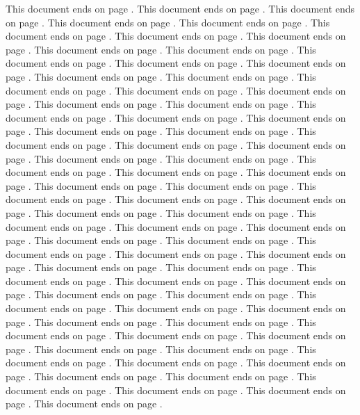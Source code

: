 \documentclass[a4paper]{article}
\begin{document}
This document ends on page \pageref{docend}.
This document ends on page \pageref{docend}.
This document ends on page \pageref{docend}.
This document ends on page \pageref{docend}.
This document ends on page \pageref{docend}.
This document ends on page \pageref{docend}.
This document ends on page \pageref{docend}.
This document ends on page \pageref{docend}.
This document ends on page \pageref{docend}.
This document ends on page \pageref{docend}.
This document ends on page \pageref{docend}.
This document ends on page \pageref{docend}.
This document ends on page \pageref{docend}.
This document ends on page \pageref{docend}.
This document ends on page \pageref{docend}.
This document ends on page \pageref{docend}.
This document ends on page \pageref{docend}.
This document ends on page \pageref{docend}.
This document ends on page \pageref{docend}.
This document ends on page \pageref{docend}.
This document ends on page \pageref{docend}.
This document ends on page \pageref{docend}.
This document ends on page \pageref{docend}.
This document ends on page \pageref{docend}.
This document ends on page \pageref{docend}.
This document ends on page \pageref{docend}.
This document ends on page \pageref{docend}.
This document ends on page \pageref{docend}.
This document ends on page \pageref{docend}.
This document ends on page \pageref{docend}.
This document ends on page \pageref{docend}.
This document ends on page \pageref{docend}.
This document ends on page \pageref{docend}.
This document ends on page \pageref{docend}.
This document ends on page \pageref{docend}.
This document ends on page \pageref{docend}.
This document ends on page \pageref{docend}.
This document ends on page \pageref{docend}.
This document ends on page \pageref{docend}.
This document ends on page \pageref{docend}.
This document ends on page \pageref{docend}.
This document ends on page \pageref{docend}.
This document ends on page \pageref{docend}.
This document ends on page \pageref{docend}.
This document ends on page \pageref{docend}.
This document ends on page \pageref{docend}.
This document ends on page \pageref{docend}.
This document ends on page \pageref{docend}.
This document ends on page \pageref{docend}.
This document ends on page \pageref{docend}.
This document ends on page \pageref{docend}.
This document ends on page \pageref{docend}.
This document ends on page \pageref{docend}.
This document ends on page \pageref{docend}.
This document ends on page \pageref{docend}.
This document ends on page \pageref{docend}.
This document ends on page \pageref{docend}.
This document ends on page \pageref{docend}.
This document ends on page \pageref{docend}.
This document ends on page \pageref{docend}.
This document ends on page \pageref{docend}.
This document ends on page \pageref{docend}.
This document ends on page \pageref{docend}.
This document ends on page \pageref{docend}.
This document ends on page \pageref{docend}.
This document ends on page \pageref{docend}.
This document ends on page \pageref{docend}.
This document ends on page \pageref{docend}.
This document ends on page \pageref{docend}.
This document ends on page \pageref{docend}.
This document ends on page \pageref{docend}.
This document ends on page \pageref{docend}.
This document ends on page \pageref{docend}.
This document ends on page \pageref{docend}.
\end{document}
